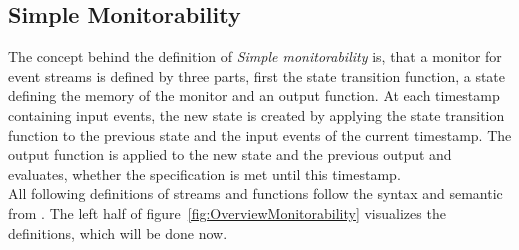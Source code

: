 	\subsection{Simple Monitorability}
		The concept behind the definition of \textit{Simple monitorability} is, that a monitor for event streams is defined by three parts, first the state transition function, a state defining the memory of the monitor and an output function. At each timestamp containing input events, the new state is created by applying the state transition function to the previous state and the input events of the current timestamp. The output function is applied to the new state and the previous output and evaluates, whether the specification is met until this timestamp.\\
		All following definitions of streams and functions follow the syntax and semantic from \cite{TeSSLa2}. The left half of figure~\ref{fig:OverviewMonitorability} visualizes the definitions, which will be done now.
